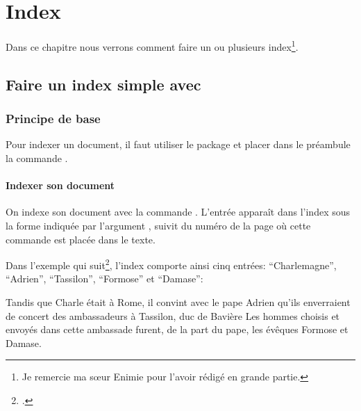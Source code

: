 \chapter{Index}

\begin{intro}

Dans ce chapitre nous verrons comment faire un ou plusieurs index\footnote{Je remercie ma sœur Enimie pour l'avoir rédigé en grande partie.}.

\end{intro}


\section{Faire un index simple avec }


\subsection{Principe de base}


Pour indexer un document, il faut utiliser le package  et placer  dans le préambule la commande .

\begin{latexcode}
\usepackage{makeidx}
\makeindex
\end{latexcode}

\subsubsection{Indexer son document}



On indexe son document avec  la commande \label{cmdindex}. L'entrée apparaît dans l'index sous la forme indiquée par l'argument , suivit du numéro de la page où cette commande est placée dans le texte. 

Dans l'exemple qui suit\footcite{eginhard}, l'index comporte ainsi cinq entrées: \enquote{Charlemagne}, \enquote{Adrien}, \enquote{Tassilon}, \enquote{Formose} et \enquote{Damase}:

\begin{latexcode}
Tandis que Charle était à Rome, il convint
avec le pape Adrien qu’ils enverraient de concert
des ambassadeurs à Tassilon, duc de Bavière
\textelp{}
Les hommes choisis et envoyés dans cette ambassade furent, de 
la part du pape, les évêques Formose et 
Damase\textelp{}.
\end{latexcode}




